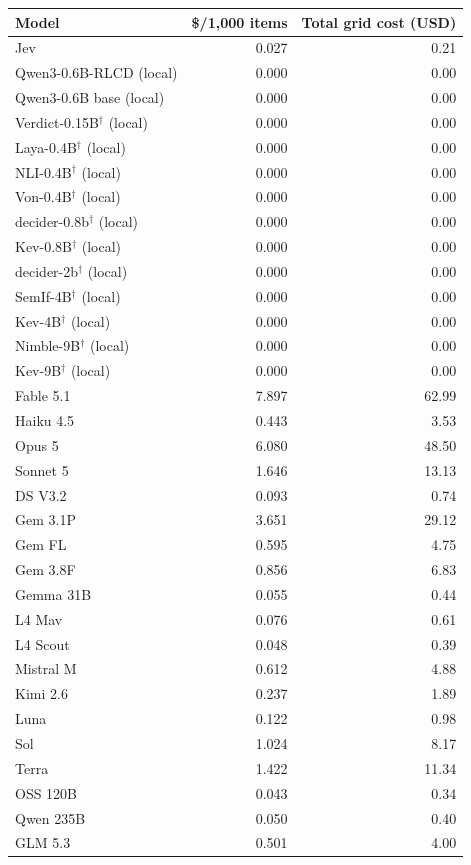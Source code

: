 \begin{tabular}{lrr}
\toprule
Model & \$/1{,}000 items & Total grid cost (USD) \\
\midrule
Jev & 0.027 & 0.21 \\
Qwen3-0.6B-RLCD (local) & 0.000 & 0.00 \\
Qwen3-0.6B base (local) & 0.000 & 0.00 \\
Verdict-0.15B$^{\dagger}$ (local) & 0.000 & 0.00 \\
Laya-0.4B$^{\dagger}$ (local) & 0.000 & 0.00 \\
NLI-0.4B$^{\dagger}$ (local) & 0.000 & 0.00 \\
Von-0.4B$^{\dagger}$ (local) & 0.000 & 0.00 \\
decider-0.8b$^{\dagger}$ (local) & 0.000 & 0.00 \\
Kev-0.8B$^{\dagger}$ (local) & 0.000 & 0.00 \\
decider-2b$^{\dagger}$ (local) & 0.000 & 0.00 \\
SemIf-4B$^{\dagger}$ (local) & 0.000 & 0.00 \\
Kev-4B$^{\dagger}$ (local) & 0.000 & 0.00 \\
Nimble-9B$^{\dagger}$ (local) & 0.000 & 0.00 \\
Kev-9B$^{\dagger}$ (local) & 0.000 & 0.00 \\
Fable 5.1 & 7.897 & 62.99 \\
Haiku 4.5 & 0.443 & 3.53 \\
Opus 5 & 6.080 & 48.50 \\
Sonnet 5 & 1.646 & 13.13 \\
DS V3.2 & 0.093 & 0.74 \\
Gem 3.1P & 3.651 & 29.12 \\
Gem FL & 0.595 & 4.75 \\
Gem 3.8F & 0.856 & 6.83 \\
Gemma 31B & 0.055 & 0.44 \\
L4 Mav & 0.076 & 0.61 \\
L4 Scout & 0.048 & 0.39 \\
Mistral M & 0.612 & 4.88 \\
Kimi 2.6 & 0.237 & 1.89 \\
Luna & 0.122 & 0.98 \\
Sol & 1.024 & 8.17 \\
Terra & 1.422 & 11.34 \\
OSS 120B & 0.043 & 0.34 \\
Qwen 235B & 0.050 & 0.40 \\
GLM 5.3 & 0.501 & 4.00 \\
\bottomrule
\end{tabular}

